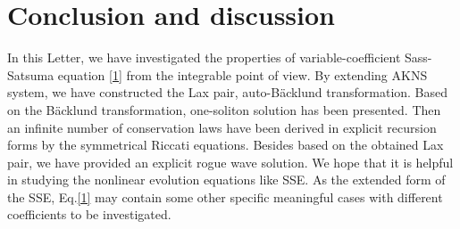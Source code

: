 \documentclass[12pt]{article}
\begin{document}
\section{Conclusion and discussion}
In this Letter, we have investigated the properties of variable-coefficient Sass-Satsuma equation \eqref{1} from the integrable point of view. By extending AKNS system, we have constructed the Lax pair, auto-B\"acklund transformation. Based on the B\"acklund transformation, one-soliton solution has been presented. Then an infinite number of conservation laws have been derived in explicit recursion forms by the symmetrical Riccati equations. Besides based on the obtained Lax pair, we have provided an explicit rogue wave solution. We hope that it is helpful in studying the nonlinear evolution equations like SSE. As the extended form of the SSE, Eq.\eqref{1} may contain some other specific meaningful cases with different coefficients to be investigated.
\end{document}
